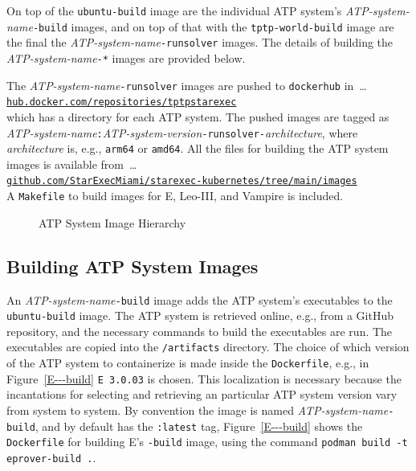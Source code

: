 \documentclass{easychair}
\newcommand{\dav}[1]{{\color{red}{David: {#1}}}}
\begin{document}
On top of the {\tt ubuntu-build} image are the individual ATP system's
{\em ATP-system-name}{\tt-build} images, and on top of that with the {\tt tptp-world-build} image 
are the final the {\em ATP-system-name}{\tt -runsolver} images.
The details of building the {\em ATP-system-name}{\tt -*} images are provided below.

The {\em ATP-system-name}{\tt -runsolver} images are pushed to {\tt dockerhub} in~\ldots\\
\hspace*{1cm}\href{https://hub.docker.com/repositories/tptpstarexec}{\tt hub.docker.com/repositories/tptpstarexec}\\
which has a directory for each ATP system.
The pushed images are tagged as 
{\em ATP-system-name}{\tt :}{\em ATP-system-version}{\tt -runsolver-}{\em architecture},
where {\em architecture} is, e.g., {\tt arm64} or {\tt amd64}.
All the files for building the ATP system images is available from~\ldots \\
\hspace*{1cm}\href{https://github.com/StarExecMiami/starexec-kubernetes/tree/main/images}{\tt github.com/StarExecMiami/starexec-kubernetes/tree/main/images}\\
A {\tt Makefile} to build images for E, Leo-III, and Vampire is included. \dav{Image file below not found}

\begin{figure}[htb]
\begin{center}
\caption{ATP System Image Hierarchy}
\label{ImageDAG}
\end{center}
\end{figure}

\subsection{Building ATP System Images}
\label{BuildingATPSystemImages}

An {\em ATP-system-name}{\tt-build} image adds the ATP system's executables to the
{\tt ubuntu-build} image.
The ATP system is retrieved online, e.g., from a GitHub repository, and the necessary commands
to build the executables are run.
The executables are copied into the {\tt /artifacts} directory.
The choice of which version of the ATP system to containerize is made inside the {\tt Dockerfile},
e.g., in Figure~\ref{E---build} {\tt E 3.0.03} is chosen.
This localization is necessary because the incantations for selecting and retrieving an
particular ATP system version vary from system to system.
By convention the image is named {\em ATP-system-name}{\tt -build}, and by default has
the {\tt :latest} tag,
Figure~\ref{E---build} shows the {\tt Dockerfile} for building E's {\tt -build} image, using 
the command {\tt podman build -t eprover-build .}.
\end{document}
